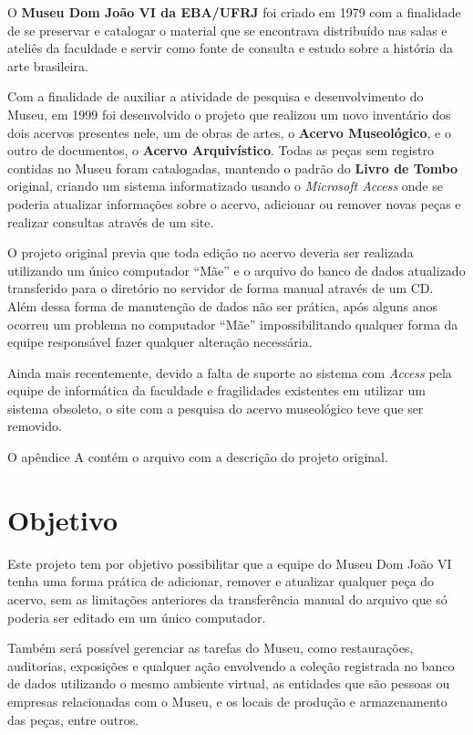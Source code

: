 \documentclass[a4paper,12pt,oneside,onecolumn,final,fleqn]{repUERJ}
\begin{document}
O \textbf{Museu Dom João VI da EBA/UFRJ} foi criado em 1979 com a finalidade de se preservar e catalogar o material que se encontrava distribuído nas salas e ateliês da faculdade e servir como fonte de consulta e estudo sobre a história da arte brasileira. 

Com a finalidade de auxiliar a atividade de pesquisa e desenvolvimento do Museu, em 1999 foi desenvolvido o projeto que realizou um novo inventário dos dois acervos presentes nele, um de obras de artes, o \textbf{Acervo Museológico}, e o outro de documentos, o \textbf{Acervo Arquivístico}. Todas as peças sem registro contidas no Museu foram catalogadas, mantendo o padrão do \textbf{Livro de Tombo} original, criando um sistema informatizado usando o \textit{Microsoft Access} onde se poderia atualizar informações sobre o acervo, adicionar ou remover novas peças e realizar consultas através de um site.

O projeto original previa que toda edição no acervo deveria ser realizada utilizando um único computador ``Mãe'' e o arquivo do banco de dados atualizado transferido para o diretório no servidor de forma manual através de um CD. Além dessa forma de manutenção de dados não ser prática, após alguns anos ocorreu um problema no computador ``Mãe'' impossibilitando qualquer forma da equipe responsável fazer qualquer alteração necessária. 

Ainda mais recentemente, devido a falta de suporte ao sistema com \textit{Access} pela equipe de informática da faculdade e fragilidades existentes em utilizar um sistema obsoleto, o site com a pesquisa do acervo museológico teve que ser removido.

O apêndice A contém o arquivo com a descrição do projeto original.


\section*{Objetivo}

Este projeto tem por objetivo possibilitar que a equipe do Museu Dom João VI tenha uma forma prática de adicionar, remover e atualizar qualquer peça do acervo, sem as limitações anteriores da transferência manual do arquivo que só poderia ser editado em um único computador.

Também será possível gerenciar as tarefas do Museu, como restaurações, auditorias, exposições e qualquer ação envolvendo a coleção registrada no banco de dados utilizando o mesmo ambiente virtual, as entidades que são pessoas ou empresas relacionadas com o Museu, e os locais de produção e armazenamento das peças, entre outros.
\end{document}
